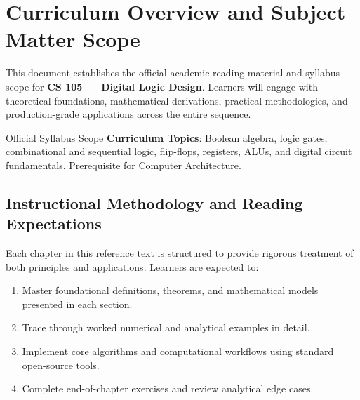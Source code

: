 \section{Curriculum Overview and Subject Matter Scope}

This document establishes the official academic reading material and syllabus scope for \textbf{CS 105 --- Digital Logic Design}. Learners will engage with theoretical foundations, mathematical derivations, practical methodologies, and production-grade applications across the entire sequence.

\begin{InsightBox}{Official Syllabus Scope}
  \textbf{Curriculum Topics}: Boolean algebra, logic gates, combinational and sequential logic, flip-flops, registers, ALUs, and digital circuit fundamentals. Prerequisite for Computer Architecture.
\end{InsightBox}

\subsection{Instructional Methodology and Reading Expectations}

Each chapter in this reference text is structured to provide rigorous treatment of both principles and applications. Learners are expected to:
\begin{enumerate}
  \item Master foundational definitions, theorems, and mathematical models presented in each section.
  \item Trace through worked numerical and analytical examples in detail.
  \item Implement core algorithms and computational workflows using standard open-source tools.
  \item Complete end-of-chapter exercises and review analytical edge cases.
\end{enumerate}

